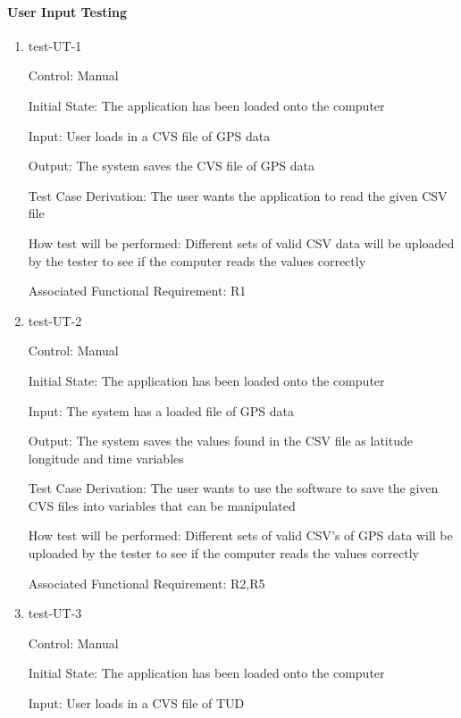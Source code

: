 \documentclass[12pt, titlepage]{article}
\begin{document}
\paragraph{User Input Testing}

\begin{enumerate}

\item{test-UT-1\\}

Control: Manual 
					
Initial State: The application has been loaded onto the computer
					
Input: User loads in a CVS file of GPS data
					
Output: The system saves the CVS file of GPS data

Test Case Derivation: The user wants the application to read the given CSV file 
					
How test will be performed: Different sets of valid CSV data will be uploaded by the tester to see if the computer reads the values correctly

Associated Functional Requirement: R1 

\item{test-UT-2\\}

Control: Manual 
					
Initial State: The application has been loaded onto the computer
					
Input: The system has a loaded file of GPS data 
					
Output: The system saves the values found in the CSV file as latitude longitude and time variables

Test Case Derivation: The user wants to use the software to save the given CVS files into variables that can be manipulated
					
How test will be performed: Different sets of valid CSV's of GPS data will be uploaded by the tester to see if the computer reads the values correctly

Associated Functional Requirement: R2,R5

\item{test-UT-3\\}

Control: Manual 
					
Initial State: The application has been loaded onto the computer
					
Input: User loads in a CVS file of TUD
					

\end{enumerate}
\end{document}
